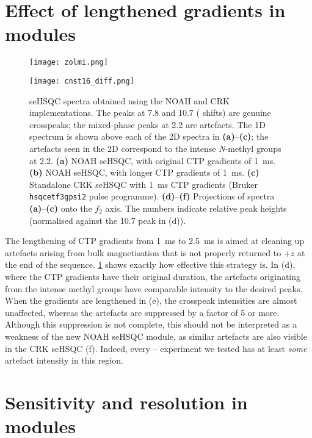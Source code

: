 \section{Effect of lengthened gradients in \texorpdfstring{\nitrogen{}}{15N} modules}
\label{section:n15_cnst16_grads}

\begin{figure}
    \centering
    \texttt{[image: zolmi.png]}\phantom{aaaaaa}

    \texttt{[image: cnst16\_diff.png]}
    \caption{
        \nitrogen{} seHSQC spectra obtained using the NOAH and CRK implementations.
        The peaks at 7.8 and \SI{10.7}{\ppm} (\proton{} shifts) are genuine crosspeaks; the mixed-phase peaks at \SI{2.2}{\ppm} are artefacts.
        The 1D \proton{} spectrum is shown above each of the 2D spectra in \textbf{(a)}--\textbf{(c)}; the artefacts seen in the 2D correspond to the intense \textit{N}-methyl groups at \SI{2.2}{\ppm}.
        \textbf{(a)} NOAH seHSQC, with original CTP gradients of \SI{1}{\ms}.
        \textbf{(b)} NOAH seHSQC, with longer CTP gradients of \SI{1}{\ms}.
        \textbf{(c)} Standalone CRK seHSQC with \SI{1}{\ms} CTP gradients (Bruker \texttt{hsqcetf3gpsi2} pulse programme).
        \textbf{(d)}--\textbf{(f)} Projections of spectra \textbf{(a)}--\textbf{(c)} onto the $f_2$ axis.
        The numbers indicate relative peak heights (normalised against the \SI{10.7}{\ppm} peak in (d)).
        \zolmi{}
    }
    \label{fig:cnst16_diff}
\end{figure}

The lengthening of CTP gradients from \SI{1}{\ms} to \SI{2.5}{\ms} is aimed at cleaning up artefacts arising from bulk magnetisation that is not properly returned to $+z$ at the end of the sequence.
\cref{fig:cnst16_diff} shows exactly how effective this strategy is.
In (d), where the CTP gradients have their original duration, the artefacts originating from the intense methyl groups have comparable intensity to the desired peaks.
When the gradients are lengthened in (e), the crosspeak intensities are almost unaffected, whereas the artefacts are suppressed by a factor of 5 or more.
Although this suppression is not complete, this should not be interpreted as a weakness of the new NOAH seHSQC module, as similar artefacts are also visible in the CRK seHSQC (f).
Indeed, every \proton{}--\nitrogen{} experiment we tested has at least \textit{some} artefact intensity in this region.

\section{Sensitivity and resolution in \texorpdfstring{\nitrogen{}}{15N} modules}
\label{section:n15_scaling}

